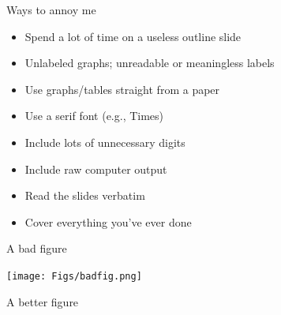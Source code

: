 \documentclass[12pt]{article}
\newcommand{\headsize}{\fontsize{35}{35} \selectfont}
\newcommand{\smallsize}{\fontsize{25}{30} \selectfont}
\begin{document}
\newpage

\headsize \color{myyellow}
\hfill \begin{minipage}{5.75in}
\centering
Ways to annoy me
\end{minipage}

\vspace{30mm} \color{mywhite} \smallsize

\hfill \begin{minipage}{9.5in}

\begin{itemize}
\itemsep18pt
\color{myblue}
\item Spend a lot of time on a useless outline slide
\color{mywhite}

\item Unlabeled graphs; unreadable or meaningless labels

\item Use graphs/tables straight from a paper

\color{myblue}
\item Use a serif font (e.g., Times)

\item Include lots of unnecessary digits

\item Include raw computer output

\item Read the slides verbatim

\item Cover everything you've ever done

\end{itemize}

\end{minipage}






\newpage

\headsize \color{myyellow}
\hfill \begin{minipage}{5.75in}
\centering
A bad figure
\end{minipage}

\vspace{30mm} \color{mywhite} \smallsize

\centerline{\texttt{[image: Figs/badfig.png]}}

\newpage

\headsize \color{myyellow}
\hfill \begin{minipage}{5.75in}
\centering
A better figure
\end{minipage}
\end{document}
